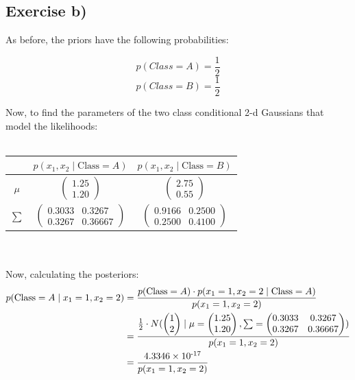 \documentclass{article}
\begin{document}
\subsection{Exercise b)}
As before, the priors have the following probabilities:

$$p(Class = A) = \frac{1}{2}$$
$$p(Class = B) = \frac{1}{2}$$

Now, to find the parameters of the two class conditional 2-d Gaussians that model the likelihoods:
\\
\\
\begin{tabular}{|c|c|c|}
    \hline
    & \( p(x_1, x_2 \mid \text{Class} = A) \) & \( p(x_1, x_2 \mid \text{Class} = B) \) \\ 
    \hline
    \( \mu \) & $\begin{pmatrix} 1.25 \\ 1.20 \end{pmatrix}$ & $\begin{pmatrix} 2.75 \\  0.55 \end{pmatrix}$ \\
    \hline
    \( \sum \) & $\begin{pmatrix} 0.3033 & 0.3267 \\ 0.3267 & 0.36667 \end{pmatrix}$ & $\begin{pmatrix} 0.9166 & 0.2500 \\ 0.2500 & 0.4100 \end{pmatrix}$ \\
    \hline
\end{tabular}
\\
\\
Now, calculating the posteriors:
\begin{align*}
    p(\text{Class} = A \mid x_1 = 1, x_2 = 2) 
    &= \frac{p(\text{Class} = A) \cdot p(x_1 = 1, x_2 = 2 \mid \text{Class} = A)}{p(x_1 = 1, x_2 = 2)} \\
    &= \frac{\frac{1}{2} \cdot N(
        \begin{pmatrix}1 \\ 2\end{pmatrix} \mid
        \mu = \begin{pmatrix}1.25 \\ 1.20\end{pmatrix},
        \sum = \begin{pmatrix}0.3033 & 0.3267 \\ 0.3267 & 0.36667 \end{pmatrix}
    )}{p(x_1 = 1, x_2 = 2)} \\
    &= \frac{4.3346 \times 10\textsuperscript{-17}}{p(x_1 = 1, x_2 = 2)}
\end{align*}
\end{document}
